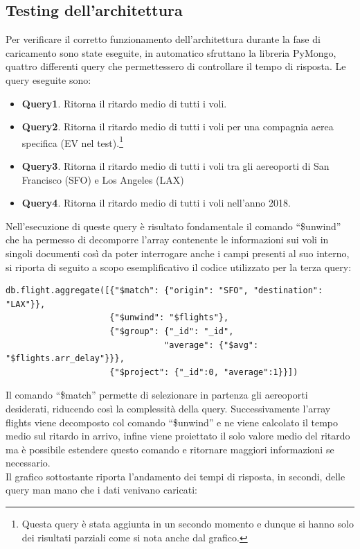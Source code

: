\documentclass[12pt]{article}
\begin{document}
\subsection{Testing dell'architettura}
Per verificare il corretto funzionamento dell'architettura durante la fase di caricamento sono state eseguite, in automatico sfruttano la libreria PyMongo, quattro differenti query che permettessero di controllare il tempo di risposta. Le query eseguite sono:
\begin{itemize}
    \item \textbf{Query1}. Ritorna il ritardo medio di tutti i voli.
    \item \textbf{Query2}. Ritorna il ritardo medio di tutti i voli per una compagnia aerea specifica (EV nel test).\footnote{Questa query è stata aggiunta in un secondo momento e dunque si hanno solo dei risultati parziali come si nota anche dal grafico.}
    \item \textbf{Query3}. Ritorna il ritardo medio di tutti i voli tra gli aereoporti di San Francisco (SFO) e Los Angeles (LAX)
    \item \textbf{Query4}. Ritorna il ritardo medio di tutti i voli nell'anno 2018.
\end{itemize}
Nell'esecuzione di queste query è risultato fondamentale il comando ``\$unwind'' che ha permesso di decomporre l'array contenente le informazioni sui voli in singoli documenti così da poter interrogare anche i campi presenti al suo interno, si riporta di seguito a scopo esemplificativo il codice utilizzato per la terza query:
\vspace{-7pt}
\begin{verbatim}
db.flight.aggregate([{"$match": {"origin": "SFO", "destination": "LAX"}},
                     {"$unwind": "$flights"},  
                     {"$group": {"_id": "_id", 
                                "average": {"$avg": "$flights.arr_delay"}}}, 
                     {"$project": {"_id":0, "average":1}}])
\end{verbatim}
\vspace{-7pt}
Il comando ``\$match'' permette di selezionare in partenza gli aereoporti desiderati, riducendo così la complessità della query. Successivamente l'array flights viene decomposto col comando ``\$unwind'' e ne viene calcolato il tempo medio sul ritardo in arrivo, infine viene proiettato il solo valore medio del ritardo ma è possibile estendere questo comando e ritornare maggiori informazioni se necessario.\\
Il grafico sottostante riporta l'andamento dei tempi di risposta, in secondi, delle query man mano che i dati venivano caricati:
\end{document}
